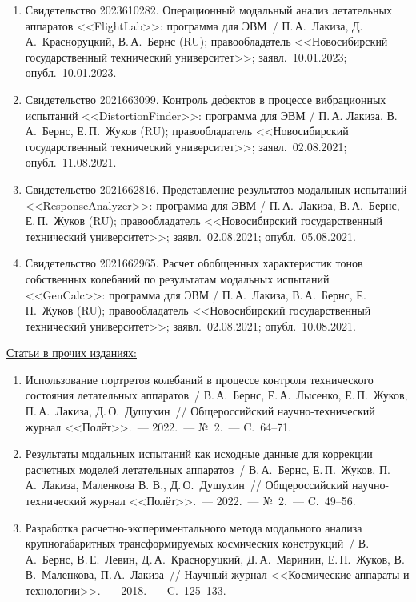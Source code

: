 \begin{enumerate}
	\item Свидетельство 2023610282. Операционный модальный анализ летательных аппаратов <<FlightLab>>: программа для ЭВМ~/ П.\,А.~Лакиза, Д.\,А.~Красноруцкий, В.\,А.~Бернс (RU); правообладатель <<Новосибирский государственный технический университет>>; заявл.~10.01.2023; опубл.~10.01.2023.
	\item Свидетельство 2021663099. Контроль дефектов в процессе вибрационных испытаний <<DistortionFinder>>: программа для ЭВМ / П.\,А. Лакиза, В.\,А.~Бернс, Е.\,П.~Жуков (RU); правообладатель <<Новосибирский государственный технический университет>>; заявл.~02.08.2021; опубл.~11.08.2021.
 	\item Свидетельство 2021662816. Представление результатов модальных испытаний <<ResponseAnalyzer>>: программа для ЭВМ / П.\,А.~Лакиза, В.\,А.~Бернс, Е.\,П.~Жуков (RU); правообладатель <<Новосибирский государственный технический университет>>; заявл.~02.08.2021; опубл.~05.08.2021.
	\item Свидетельство 2021662965. Расчет обобщенных характеристик тонов собственных колебаний по результатам модальных испытаний <<GenCalc>>: программа для ЭВМ / П.\,А.~Лакиза, В.\,А.~Бернс, Е.\,П.~Жуков (RU); правообладатель <<Новосибирский государственный технический университет>>; заявл.~02.08.2021; опубл.~10.08.2021.
\end{enumerate}

\ul{Статьи в прочих изданиях:}

\begin{enumerate}
	\item Использование портретов колебаний в процессе контроля технического состояния летательных аппаратов~/ В.\,А.~Бернс, Е.\,А.~Лысенко, Е.\,П.~Жуков, П.\,А.~Лакиза, Д.\,О.~Душухин~// Общероссийский научно-технический журнал <<Полёт>>.~--- 2022.~--- №~2.~--- C.~64--71.
	\item Результаты модальных испытаний как исходные данные для коррекции расчетных моделей летательных аппаратов~/ В.\,А.~Бернс, Е.\,П.~Жуков, П.\,А.~Лакиза, Маленкова В. В., Д.\,О.~Душухин~// Общероссийский научно-технический журнал <<Полёт>>.~--- 2022.~--- №~2.~--- C.~49--56.
	\item Разработка расчетно-экспериментального метода модального анализа крупногабаритных трансформируемых космических конструкций~/ В.\,А.~Бернс, В.\,Е.~Левин, Д.\,А.~Красноруцкий, Д.\,А.~Маринин, Е.\,П.~Жуков, В.\,В.~Маленкова, П.\,А.~Лакиза~// Научный журнал <<Космические аппараты и технологии>>.~--- 2018.~--- C.~125--133.
\end{enumerate}